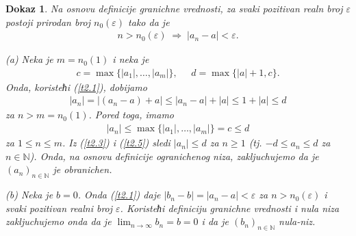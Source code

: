 \documentclass[11pt,a4paper]{article}
\newtheorem*{dokaz}{Dokaz}
\begin{document}
\begin{dokaz}
Na osnovu definicije granichne vrednosti, 
za svaki pozitivan realn broj $\varepsilon$ postoji prirodan broj 
$n_{0}(\varepsilon)$ tako da je 
\begin{align}\label{t2.1}
    n>n_{0}(\varepsilon)
    \;\Rightarrow\; 
    |a_n-a|<\varepsilon. 
\end{align}

(a)
Neka je $m=n_0(1)$ i neka je 
\begin{align*}
    c=\max\{|a_1|,\dots,|a_m|\}, 
    \;\;\;\;\; 
    d=\max\{|a|+1,c\}. 
\end{align*}
Onda, koristeћi (\ref{t2.1}), dobijamo 
\begin{align}\label{t2.3}
    |a_n|=|(a_n-a)+a|
    \leq 
    |a_n-a|+|a|
    \leq 
    1+|a|
    \leq 
    d
\end{align}
za $n>m=n_0(1)$. 
Pored toga, imamo  
\begin{align}\label{t2.5}
    |a_n|
    \leq 
    \max\{|a_1|,\dots,|a_m|\}
    =
    c
    \leq d
\end{align}
za $1\leq n\leq m$. 
Iz (\ref{t2.3}) i (\ref{t2.5}) sledi 
$|a_n|\leq d$ za $n\geq 1$
(tj. $-d\leq a_n\leq d$ za $n\in\mathbb{N}$).
Onda, na osnovu definicije ogranichenog niza, 
zakljuchujemo da je $(a_n)_{n\in\mathbb{N}}$ je obranichen. 

(b)
Neka je $b=0$. Onda (\ref{t2.1}) daje 
$|b_n-b|=|a_n-a|<\varepsilon$
za $n>n_0(\varepsilon)$ i svaki pozitivan realni broj $\varepsilon$. 
Koristeћi definiciju granichne vrednosti i nula niza 
zakljuchujemo onda da je 
$\displaystyle\lim_{n\rightarrow\infty}b_n=b=0$ i 
da je $(b_n)_{n\in\mathbb{N}}$ nula-niz. 
\end{dokaz}
\end{document}
